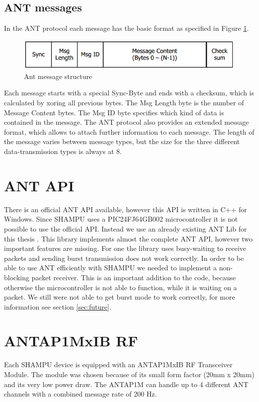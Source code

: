 \subsection{ANT messages}
In the ANT protocol each message has the basic format as specified in Figure \ref{fig:antmsg}.
\begin{figure}[H]
	\centering
	\includegraphics[scale=.75]{content/images/ANTmsg.png}
	\caption{Ant message structure\cite{DynastreamInnovationsInc.2013}}\label{fig:antmsg}
\end{figure}
Each message starts with a special Sync-Byte and ends with a checksum, which is calculated by xoring all previous bytes. The Msg Length byte is the number of Message Content bytes. The Msg ID byte specifies which kind of data is contained in the message. The ANT protocol also provides an extended message format, which allows to attach further information to each message. The length of the message varies between message types, but the size for the three different data-transmission types is always at 8.

\section{ANT API}
There is an official ANT API \cite{ANTWinLib} available, however this API is written in C++ for Windows. Since SHAMPU uses a PIC24FJ64GB002 microcontroller\cite{Smeets:2014:DAL:2602339.2602401} it is not possible to use the official API. Instead we use an already existing ANT Lib for this thesis \cite{ANTPICLIB}. This library implements almost the complete ANT API, however two important features are missing. For one the library uses busy-waiting to receive packets and sending burst transmission does not work correctly. In order to be able to use ANT efficiently with SHAMPU we needed to implement a non-blocking packet receiver. This is an important addition to the code, because otherwise the microcontroller is not able to function, while it is waiting on a packet. We still were not able to get burst mode to work correctly, for more information see section \ref{sec:future}.

\section{ANTAP1MxIB RF}
Each SHAMPU device is equipped with an ANTAP1MxIB RF Transceiver Module. The module was chosen because of its small form factor (20mm x 20mm) and its very low power draw. The ANTAP1M can handle up to 4 different ANT channels with a combined message rate of 200 Hz. 

